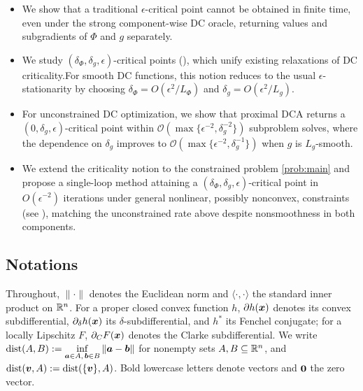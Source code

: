 \documentclass[english]{article}
\begin{document}
\begin{itemize}
\item We show that a traditional $\epsilon$-critical point cannot be
obtained in finite time, even under the strong component-wise DC
oracle, returning values and subgradients of $\Phi$ and $g$
separately.


\item We study $(\delta_\Phi,\delta_g,\epsilon)$-critical points
(), which unify existing relaxations of
DC criticality.For smooth DC functions, this notion reduces to the usual
$\epsilon$-stationarity by  choosing \(\delta_\Phi=O(\epsilon^2/L_\Phi)\) and \(\delta_g=O(\epsilon^2/L_g)\).

\item For unconstrained DC optimization, we show that proximal DCA returns a \((0,\delta_g,\epsilon)\)-critical point within
\(\mathcal O(\max\limits\{\epsilon^{-2},\delta_g^{-2}\})\) subproblem solves,
where the dependence on \(\delta_g\) improves to
\(\mathcal O(\max\limits\{\epsilon^{-2},\delta_g^{-1}\})\) when \(g\) is
\(L_g\)-smooth. 

\item We extend the criticality notion to the constrained problem
\eqref{prob:main} and propose a single-loop method attaining a
$(\delta_\Phi,\delta_g,\epsilon)$-critical point in $O(\epsilon^{-2})$
iterations under general nonlinear, possibly nonconvex, constraints
(see ), matching the unconstrained rate above
despite nonsmoothness in both components.
\end{itemize}


\subsection{Notations}
Throughout, $\|\cdot\|$ denotes the Euclidean norm and
$\langle\cdot,\cdot\rangle$ the standard inner product on $\mathbb{R}^n$. For
a proper closed convex function $h$, $\partial h(\bm{x})$ denotes its
convex subdifferential, $\partial_\delta h(\bm{x})$ its
$\delta$-subdifferential, and $h^*$ its Fenchel conjugate; for a
locally Lipschitz $F$, $\partial_C F(\bm{x})$ denotes the Clarke
subdifferential. We write
$\operatorname{dist}(A,B) := \inf\limits_{\bm{a}\in A,\,\bm{b}\in B}\|\bm{a}-\bm{b}\|$
for nonempty sets $A,B\subseteq\mathbb{R}^n$, and $\operatorname{dist}(\bm{v},A)
:= \operatorname{dist}(\{\bm{v}\},A)$. Bold lowercase letters denote
vectors and $\bm{0}$ the zero vector.
\end{document}
